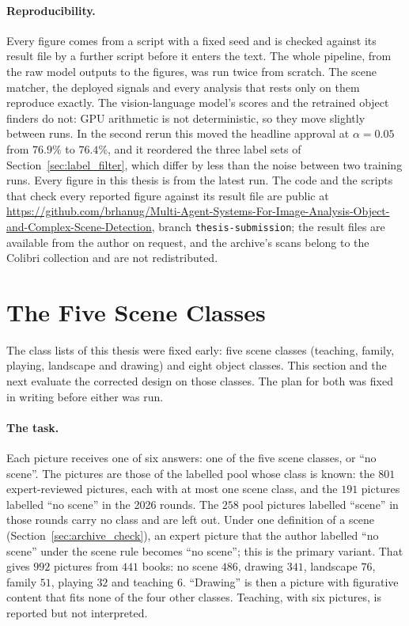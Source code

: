 \paragraph{Reproducibility.} Every figure comes from a script with a fixed seed and is checked against its result file by a further script before it enters the text. The whole pipeline, from the raw model outputs to the figures, was run twice from scratch. The scene matcher, the deployed signals and every analysis that rests only on them reproduce exactly. The vision-language model's scores and the retrained object finders do not: GPU arithmetic is not deterministic, so they move slightly between runs. In the second rerun this moved the headline approval at $\alpha = 0.05$ from $76.9\%$ to $76.4\%$, and it reordered the three label sets of Section~\ref{sec:label_filter}, which differ by less than the noise between two training runs. Every figure in this thesis is from the latest run. The code and the scripts that check every reported figure against its result file are public at \url{https://github.com/brhanug/Multi-Agent-Systems-For-Image-Analysis-Object-and-Complex-Scene-Detection}, branch \texttt{thesis-submission}; the result files are available from the author on request, and the archive's scans belong to the Colibri collection and are not redistributed.

\section{The Five Scene Classes}
\label{sec:scene_classes}

The class lists of this thesis were fixed early: five scene classes (teaching, family, playing, landscape and drawing) and eight object classes. This section and the next evaluate the corrected design on those classes. The plan for both was fixed in writing before either was run.

\paragraph{The task.} Each picture receives one of six answers: one of the five scene classes, or ``no scene''. The pictures are those of the labelled pool whose class is known: the $801$ expert-reviewed pictures, each with at most one scene class, and the $191$ pictures labelled ``no scene'' in the 2026 rounds. The $258$ pool pictures labelled ``scene'' in those rounds carry no class and are left out. Under one definition of a scene (Section~\ref{sec:archive_check}), an expert picture that the author labelled ``no scene'' under the scene rule becomes ``no scene''; this is the primary variant. That gives $992$ pictures from $441$ books: no scene $486$, drawing $341$, landscape $76$, family $51$, playing $32$ and teaching $6$. ``Drawing'' is then a picture with figurative content that fits none of the four other classes. Teaching, with six pictures, is reported but not interpreted.

